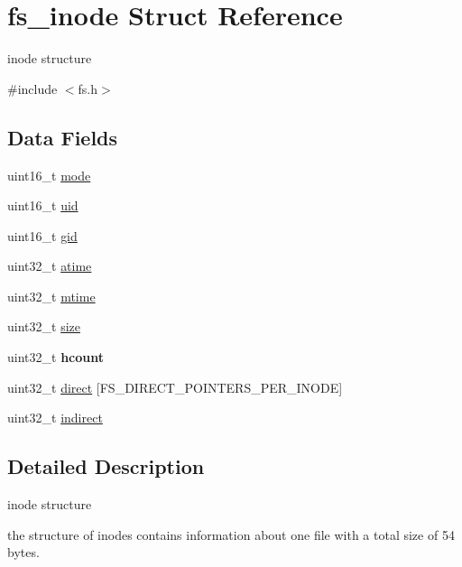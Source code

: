 \hypertarget{structfs__inode}{}\section{fs\+\_\+inode Struct Reference}
\label{structfs__inode}


inode structure  




{\ttfamily \#include $<$fs.\+h$>$}

\subsection*{Data Fields}
\begin{DoxyCompactItemize}
\item 
uint16\+\_\+t \mbox{\hyperlink{structfs__inode_a04b2f2016a6abba84872c15d6554c6b1}{mode}}
\item 
uint16\+\_\+t \mbox{\hyperlink{structfs__inode_ada0d9d68adb122d7e83558a1b8f683ec}{uid}}
\item 
uint16\+\_\+t \mbox{\hyperlink{structfs__inode_a93b1c3bdde3437a4dbfe538ffe47dc01}{gid}}
\item 
uint32\+\_\+t \mbox{\hyperlink{structfs__inode_a3c7fa94aa9d0d94355efb5fd53613a64}{atime}}
\item 
uint32\+\_\+t \mbox{\hyperlink{structfs__inode_ab11566bfc13bcd9f7cf24121447b0cfd}{mtime}}
\item 
uint32\+\_\+t \mbox{\hyperlink{structfs__inode_ac10de2ad4b7c87da65fc17b5674b5759}{size}}
\item 
\mbox{\label{structfs__inode_a0057adf5604e607679e68a94ab3e5cd9}} 
uint32\+\_\+t {\bfseries hcount}
\item 
uint32\+\_\+t \mbox{\hyperlink{structfs__inode_a2d0c4627d2c8925e6a51502fa47685aa}{direct}} \mbox{[}F\+S\+\_\+\+D\+I\+R\+E\+C\+T\+\_\+\+P\+O\+I\+N\+T\+E\+R\+S\+\_\+\+P\+E\+R\+\_\+\+I\+N\+O\+DE\mbox{]}
\item 
uint32\+\_\+t \mbox{\hyperlink{structfs__inode_a5cde1770f044b6566f36f6acdf958beb}{indirect}}
\end{DoxyCompactItemize}


\subsection{Detailed Description}
inode structure 

the structure of inodes contains information about one file with a total size of 54 bytes. 

